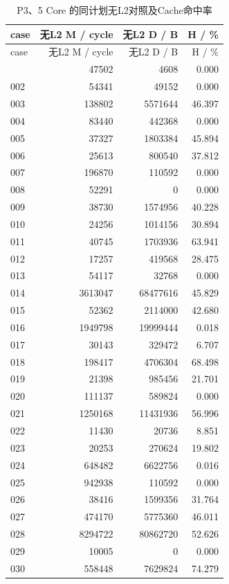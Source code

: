 \documentclass[anonymous,notoc]{gmcm2026}
\begin{document}
\begin{longtable}{lrrr}
\caption{P3、5 Core 的同计划无L2对照及Cache命中率}\\
\toprule
case & 无L2 M / cycle & 无L2 D / B & H / \%\\\midrule
\endfirsthead
\toprule
case & 无L2 M / cycle & 无L2 D / B & H / \%\\\midrule
\endhead
\bottomrule\endfoot
001 & 47502 & 4608 & 0.000 \\
002 & 54341 & 49152 & 0.000 \\
003 & 138802 & 5571644 & 46.397 \\
004 & 83440 & 442368 & 0.000 \\
005 & 37327 & 1803384 & 45.894 \\
006 & 25613 & 800540 & 37.812 \\
007 & 196870 & 110592 & 0.000 \\
008 & 52291 & 0 & 0.000 \\
009 & 38730 & 1574956 & 40.228 \\
010 & 24256 & 1014156 & 30.894 \\
011 & 40745 & 1703936 & 63.941 \\
012 & 17257 & 419568 & 28.475 \\
013 & 54117 & 32768 & 0.000 \\
014 & 3613047 & 68477616 & 45.829 \\
015 & 52362 & 2114000 & 42.680 \\
016 & 1949798 & 19999444 & 0.018 \\
017 & 30143 & 329472 & 6.707 \\
018 & 198417 & 4706304 & 68.498 \\
019 & 21398 & 985456 & 21.701 \\
020 & 111137 & 589824 & 0.000 \\
021 & 1250168 & 11431936 & 56.996 \\
022 & 11430 & 20736 & 8.851 \\
023 & 20253 & 270624 & 19.802 \\
024 & 648482 & 6622756 & 0.016 \\
025 & 942938 & 110592 & 0.000 \\
026 & 38416 & 1599356 & 31.764 \\
027 & 474170 & 5775360 & 46.011 \\
028 & 8294722 & 80862720 & 52.626 \\
029 & 10005 & 0 & 0.000 \\
030 & 558448 & 7629824 & 74.279 \\

\end{longtable}
\end{document}

